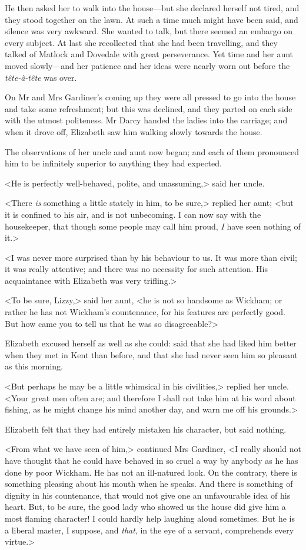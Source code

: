 He then asked her to walk into the house—but she declared herself not tired, and they stood together on the lawn. At such a time much might have been said, and silence was very awkward. She wanted to talk, but there seemed an embargo on every subject. At last she recollected that she had been travelling, and they talked of Matlock and Dovedale with great perseverance. Yet time and her aunt moved slowly—and her patience and her ideas were nearly worn out before the \textit{tête-à-tête} was over.

On Mr and Mrs Gardiner's coming up they were all pressed to go into the house and take some refreshment; but this was declined, and they parted on each side with the utmost politeness. Mr Darcy handed the ladies into the carriage; and when it drove off, Elizabeth saw him walking slowly towards the house.

The observations of her uncle and aunt now began; and each of them pronounced him to be infinitely superior to anything they had expected.

<He is perfectly well-behaved, polite, and unassuming,> said her uncle.

<There \textit{is} something a little stately in him, to be sure,> replied her aunt; <but it is confined to his air, and is not unbecoming. I can now say with the housekeeper, that though some people may call him proud, \textit{I} have seen nothing of it.>

<I was never more surprised than by his behaviour to us. It was more than civil; it was really attentive; and there was no necessity for such attention. His acquaintance with Elizabeth was very trifling.>

<To be sure, Lizzy,> said her aunt, <he is not so handsome as Wickham; or rather he has not Wickham's countenance, for his features are perfectly good. But how came you to tell us that he was so disagreeable?>

Elizabeth excused herself as well as she could: said that she had liked him better when they met in Kent than before, and that she had never seen him so pleasant as this morning.

<But perhaps he may be a little whimsical in his civilities,> replied her uncle. <Your great men often are; and therefore I shall not take him at his word about fishing, as he might change his mind another day, and warn me off his grounds.>

Elizabeth felt that they had entirely mistaken his character, but said nothing.

<From what we have seen of him,> continued Mrs Gardiner, <I really should not have thought that he could have behaved in so cruel a way by anybody as he has done by poor Wickham. He has not an ill-natured look. On the contrary, there is something pleasing about his mouth when he speaks. And there is something of dignity in his countenance, that would not give one an unfavourable idea of his heart. But, to be sure, the good lady who showed us the house did give him a most flaming character! I could hardly help laughing aloud sometimes. But he is a liberal master, I suppose, and \textit{that}, in the eye of a servant, comprehends every virtue.>

